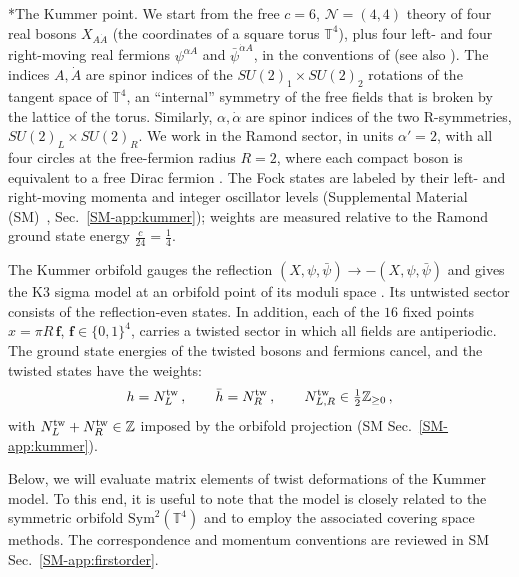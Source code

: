 \documentclass[aps,twocolumn,preprintnumbers,groupedaddress,nofootinbib,prl]{revtex4-2}
\makeatletter
\renewcommand\paragraph{\@startsection{paragraph}{4}{\parindent}{\z@}{-1em}{\normalfont\normalsize\bfseries}}
\newcommand{\Sym}{\mathrm{Sym}}
\newcommand{\Tf}{\mathbb T^4}
\newcommand{\bff}{\mathbf f}
\makeatother
\begin{document}
\paragraph*{The Kummer point.}
We start from the free $c=6$, $\mathcal N=(4,4)$ theory of four real bosons $X_{A\dot A}$ (the coordinates of a square torus $\Tf$), plus four left- and four right-moving real fermions $\psi^{\alpha A}$ and $\bar\psi^{\dot\alpha A}$, in the conventions of \cite{Guo:2019ady} (see also \cite{Avery:2010er}). The indices $A,\dot A$ are spinor indices of the $SU(2)_1\times SU(2)_2$ rotations of the tangent space of $\Tf$, an ``internal'' symmetry of the free fields that is broken by the lattice of the torus. Similarly, $\alpha,\dot\alpha$ are spinor indices of the two R-symmetries, $SU(2)_L\times SU(2)_R$. We work in the Ramond sector, in units $\alpha'=2$, with all four circles at the free-fermion radius $R=2$, where each compact boson is equivalent to a free Dirac fermion \cite{Ginsparg:1988ui}. The Fock states are labeled by their left- and right-moving momenta and integer oscillator levels (Supplemental Material (SM)~\cite{SupplementalMaterial}, Sec.~\ref{SM-app:kummer}); weights are measured relative to the Ramond ground state energy $\frac{c}{24}=\frac14$.

The Kummer orbifold gauges the reflection $(X,\psi,\bar\psi)\to-(X,\psi,\bar\psi)$ and gives the K3 sigma model at an orbifold point of its moduli space \cite{Dijkgraaf:1996xw,Seiberg:1999xz}. Its untwisted sector consists of the reflection-even states. In addition, each of the $16$ fixed points $x=\pi R\,\bff$, $\bff\in\{0,1\}^4$, carries a twisted sector in which all fields are antiperiodic. The ground state energies of the twisted bosons and fermions cancel, and the twisted states have the weights:
\begin{equation}
\label{eq:weights_tw}
h=N^{\rm tw}_L\,,\qquad \bar h=N^{\rm tw}_R\,,\qquad N^{\rm tw}_{L,R}\in\tfrac12\mathbb Z_{\ge0}\,,
\end{equation}
with $N^{\rm tw}_L+N^{\rm tw}_R\in\mathbb Z$ imposed by the orbifold projection (SM Sec.~\ref{SM-app:kummer}). 

Below, we will evaluate matrix elements of twist deformations of the Kummer model. To this end, it is useful to note that the model is closely related to the symmetric orbifold $\Sym^2(\Tf)$ \cite{Lunin:2001pw,Avery:2010er,Guo:2019ady} and to employ the associated covering space methods. The correspondence and momentum conventions are reviewed in SM Sec.~\ref{SM-app:firstorder}.\\
\end{document}
